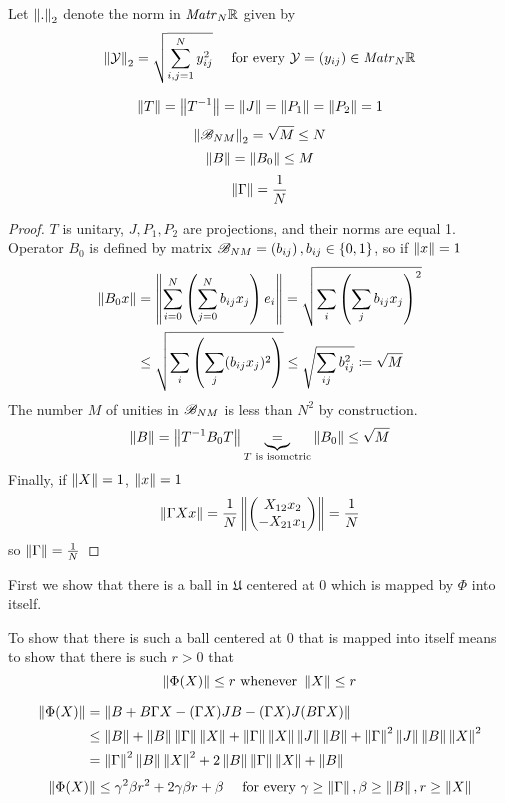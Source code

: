 \documentclass{article}
\begin{document}
Let \( \normex{2}{.} \) denote the norm in \( \matr{N}{\RR} \) given by
\[\normex{2}{\mathcal Y} = \sqrt{\sum_{i,j=1}^N y_{ij}^2} \quad\text{ for every } \mathcal Y = \left(y_{ij}\right) \in \matr{N}{\RR}\]
\begin{lemma}
    \[\norm T = \norm{T^{-1}} = \norm J = \norm{P_1} = \norm{P_2} = 1\]
    \[\normex{2}{\perturbmatrix{N}{M}} = \sqrt{M} \leq N\]
    \[\norm B = \norm{B_0} \leq M\]
    \[\norm{\Gamma} = \frac{1}{N}\]
\end{lemma}
\begin{proof}
    \( T \) is unitary, \( J, P_1, P_2 \) are projections, and their norms are equal 1.
    Operator \( B_0 \) is defined by matrix \( \perturbmatrix{N}{M} = \left(b_{ij}\right), b_{ij}\in\{0,1\} \),
    so if \( \norm x = 1 \)
    \[
        \begin{split}
            \norm{B_0 x} &= \norm{\sum_{i=0}^N \left(\sum_{j=0}^N b_{ij} x_j\right) e_i}
            = \sqrt{\sum_i \left(\sum_j b_{ij} x_j\right)^2} \\
            &\leq \sqrt{\sum_i \left(\sum_j (b_{ij} x_j)^2\right)}
            \leq \sqrt{\sum_{ij} b_{ij}^2} \eqdef \sqrt M
        \end{split}
    \]
The number \( M \) of unities in \( \perturbmatrix{N}{M} \) is less than \( N^2 \) by construction.
\[\norm B = \norm{T^{-1} B_0 T} \underbrace{=}_{T \text{ is isometric}} \norm{B_0} \leq \sqrt M\]
    Finally, if \( \norm X = 1 \), \( \norm x = 1 \)
    \[\norm{\Gamma X x} = \frac1N \norm{\begin{pmatrix}X_{12}x_2 \\ -X_{21}x_1\end{pmatrix}} = \frac1N\]
    so \( \norm\Gamma = \frac1N \)
\end{proof}

First we show that there is a ball in \( \mathfrak U \) centered at \( 0 \)
which is mapped by \( \Phi \) into itself.

To show that there is such a ball centered at \( 0 \) that is mapped into itself
means to show that there is such \( r>0 \) that
\[\norm{\Phi(X)} \leq r \text{ whenever } \norm{X}\leq r\]

    \begin{align*}
        \norm{\Phi(X)} &=    \norm{B + B\Gamma X - (\Gamma X) JB - (\Gamma X)J(B\Gamma X)} \\
                     &\leq \norm{B} + \norm{B}\norm{\Gamma} \norm{X} + \norm{\Gamma}\norm{X}\norm{J}\norm{B} + \norm{\Gamma}^2\norm{J}\norm{B}\norm{X}^2 \\
                     & = \norm{\Gamma}^2\norm{B}\norm{X}^2 + 2\norm{B}\norm{\Gamma}\norm{X} + \norm{B}
    \end{align*}
    \begin{equation}
        \label{eq:phi_norm_b1}
        \norm{\Phi(X)}
        \leq
            \gamma^2\beta r^2 + 2\gamma\beta r + \beta
            \quad \text{ for every } \gamma\geq\norm{\Gamma}, \beta\geq\norm{B}, r\geq\norm{X}
    \end{equation}
\end{document}
